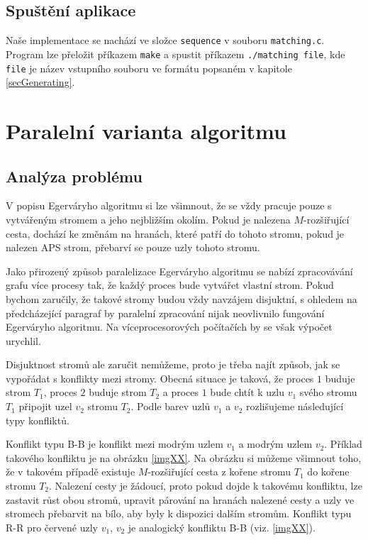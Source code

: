 \documentclass[a4paper, 11pt, titlepage, final]{article}[3. prosinec 2011]
\begin{document}
\subsection{Spuštění aplikace}

Naše implementace se nachází ve složce \texttt{sequence} v souboru \texttt{matching.c}. Program lze přeložit příkazem \texttt{make} a spustit příkazem \texttt{./matching file}, kde \texttt{file} je název vstupního souboru ve formátu popsaném v kapitole \ref{secGenerating}.

\section{Paralelní varianta algoritmu}

\subsection{Analýza problému}

V popisu Egerváryho algoritmu si lze všimnout, že se vždy pracuje pouze s vytvářeným stromem a jeho nejbližším okolím. Pokud je nalezena $M$-rozšiřující cesta, dochází ke změnám na hranách, které patří do tohoto stromu, pokud je nalezen APS strom, přebarví se pouze uzly tohoto stromu.

Jako přirozený způsob paralelizace Egerváryho algoritmu se nabízí zpracovávání grafu více procesy tak, že každý proces bude vytvářet vlastní strom. Pokud bychom zaručily, že takové stromy budou vždy navzájem disjuktní, s ohledem na předcházející paragraf by paralelní zpracování nijak neovlivnilo fungování Egerváryho algoritmu. Na víceprocesorových počítačích by se však výpočet urychlil.

Disjuktnost stromů ale zaručit nemůžeme, proto je třeba najít způsob, jak se vypořádat s konflikty mezi stromy. Obecná situace je taková, že proces $1$ buduje strom $T_1$, proces $2$ buduje strom $T_2$ a proces $1$ bude chtít k uzlu $v_1$ svého stromu $T_1$ připojit uzel $v_2$ stromu $T_2$. Podle barev uzlů $v_1$ a $v_2$ rozlišujeme následující typy konfliktů.

Konflikt typu B-B je konflikt mezi modrým uzlem $v_1$ a modrým uzlem $v_2$. Příklad takového konfliktu je na obrázku \ref{imgXX}. Na obrázku si můžeme všimnout toho, že v takovém případě existuje $M$-rozšiřující cesta z kořene stromu $T_1$ do kořene stromu $T_2$. Nalezení cesty je žádoucí, proto pokud dojde k takovému konfliktu, lze zastavit růst obou stromů, upravit párování na hranách nalezené cesty a uzly ve stromech přebarvit na bílo, aby byly k dispozici dalším stromům. Konflikt typu R-R pro červené uzly $v_1$, $v_2$ je analogický konfliktu B-B (viz. \ref{imgXX}).
\end{document}
